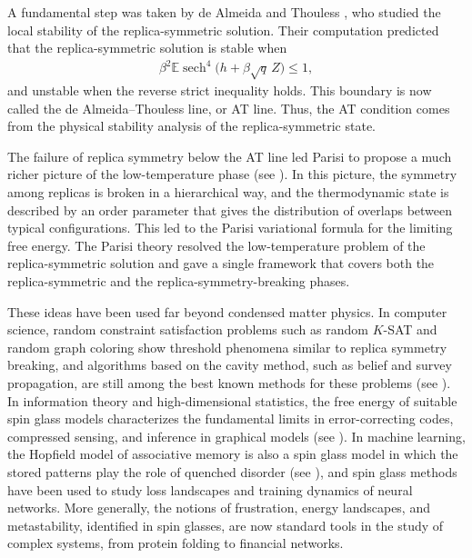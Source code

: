 \documentclass[11pt]{article}
\numberwithin{equation}{section}
\newcommand{\1}{\mathbf 1}
\begin{document}
A fundamental step was taken by de Almeida and Thouless \cite{deAlmeidaThouless1978}, who studied the local stability of the replica-symmetric solution. 
Their computation predicted that the replica-symmetric solution is  stable when
\begin{align}
    \label{eq: AT region}
\beta^2\mathbb E\operatorname{sech}^4\bigl(h+\beta\sqrt q\,Z\bigr)\leq 1,
\end{align}
and unstable when the reverse strict inequality holds. This boundary is now called the de Almeida--Thouless line, or AT line. Thus, the AT condition comes from the physical stability analysis of the replica-symmetric state.

The failure of replica symmetry below the AT line led Parisi to propose a much richer picture of the low-temperature phase (see \cite{Parisi1979,Parisi1980}). In this picture, the symmetry among replicas is broken in a hierarchical way, and the thermodynamic state is described by an order parameter that gives the distribution of overlaps between typical configurations. This led to the Parisi variational formula for the limiting free energy. The Parisi theory resolved the low-temperature problem of the replica-symmetric solution and gave a single framework that covers both the replica-symmetric and the replica-symmetry-breaking phases.

These ideas have been used far beyond condensed matter physics. In computer science, random constraint satisfaction problems such as random $K$-SAT and random graph coloring show threshold phenomena similar to replica symmetry breaking, and algorithms based on the cavity method, such as belief and survey propagation, are still among the best known methods for these problems (see \cite{MezardParisiZecchina2002,MezardMontanari2009}). In information theory and high-dimensional statistics, the free energy of suitable spin glass models characterizes the fundamental limits in error-correcting codes, compressed sensing, and inference in graphical models (see \cite{Nishimori2001,ZdeborovaKrzakala2016}).   In machine learning, the Hopfield model of associative memory is also a spin glass model in which the stored patterns play the role of quenched disorder (see \cite{Hopfield1982}), and spin glass methods have been used to study loss landscapes and training dynamics of neural networks. More generally, the notions of frustration, energy landscapes, and metastability, identified in spin glasses, are now standard tools in the study of complex systems, from protein folding to financial networks.
\end{document}
